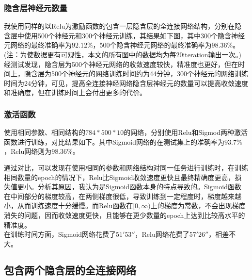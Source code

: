 \documentclass[11pt,utf8]{article}
\begin{document}
          \subsubsection*{隐含层神经元数量}
            \indent 我使用同样的以Relu为激励函数的包含一层隐含层的全连接网络结构，分别在隐含层中使用500个神经元和300个神经元训练，其结果如下图，其中300个隐含神经元网络的最终准确率为$92.12\%$，500个隐含神经元网络的最终准确率为$98.36\%$。(注：为使数据更有可观性，本文的所有图中的数据均为每20iteration输出一次。)\\
            \indent 经测试发现，隐含层为500个神经元网络的收敛速度较快，精准度也更好，但在时间上，隐含层为500个神经元的网络训练时间约为44分钟，300个神经元的网络训练时间为24分钟，可见，提高全连接神经网络隐含层神经元的数量可以提高收敛速度和准确度，但在训练时间上会付出更多的代价。\\
            \begin{center}
            \end{center}
          \subsubsection*{激活函数}
            \indent 使用相同参数、相同结构的$784*500*10$的网络，分别使用Relu和Sigmod两种激活函数进行训练，对比结果如下。其中Sigmoid网络的在测试集上的准确率为$93.7\%$，Relu网络则为$98.36\%$。\\
            \begin{center}
            \end{center}
            \indent \indent 通过对比，可以发现在使用相同的参数和网络结构对同一任务进行训练时，在训练相同数量的epoch的情况下，Relu比Sigmoid收敛速度更快且最终精确度更高，损失值更小。分析其原因，我认为是Sigmoid函数本身的特点导致的。Sigmoid函数在中间部分的梯度较高，在两侧梯度很低，导致训练到一定程度时，梯度越来越小，从而训练速度十分缓慢。而Relu函数在$[0, \infty) $上的梯度为常数，不会出现梯度消失的问题，因而收敛速度更快，且能够在更少数量的epoch上达到比较高水平的精准度。\\
            \indent 在训练时间方面，Sigmoid网络花费了$51'53''$，Relu网络花费了$57'26''$，相差不大。
        \subsection*{包含两个隐含层的全连接网络}
\end{document}
